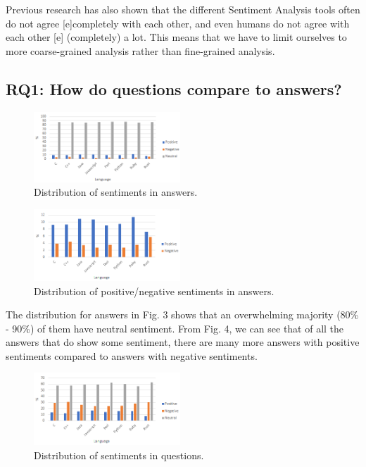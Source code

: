 \documentclass[conference]{IEEEtran}
\begin{document}
Previous research has also shown that the different Sentiment Analysis tools often do not agree [e]completely with each other, and even humans do not agree with each other [e] (completely) a lot. This means that we have to limit ourselves to more coarse-grained analysis rather than fine-grained analysis\cite{b26, b35, b36}. \\

\subsection{RQ1: How do questions compare to answers?}

\begin{figure}[htbp]
\centerline{\includegraphics[width=0.49\textwidth]{figures/summNeutralA.png}}
\caption{Distribution of sentiments in answers.}
\label{fig}
\end{figure}

\begin{figure}[htbp]
\centerline{\includegraphics[width=0.49\textwidth]{figures/summA.png}}
\caption{Distribution of positive/negative sentiments in answers.}
\label{fig}
\end{figure}

The distribution for answers in Fig. 3 shows that an overwhelming majority (80\% - 90\%) of them have neutral sentiment. From Fig. 4, we can see that of all the answers that do show some sentiment, there are many more answers with positive sentiments compared to answers with negative sentiments.\\

\begin{figure}[htbp]
\centerline{\includegraphics[width=0.49\textwidth]{figures/summNeutralQ.png}}
\caption{Distribution of sentiments in questions.}
\label{fig}
\end{figure}
\end{document}
